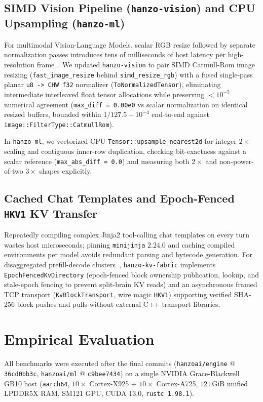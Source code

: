 \documentclass[11pt,a4paper]{article}
\begin{document}
\subsection{SIMD Vision Pipeline (\texttt{hanzo-vision}) and CPU Upsampling (\texttt{hanzo-ml})}
For multimodal Vision-Language Models, scalar RGB resize followed by separate normalization passes introduces tens of milliseconds of host latency per high-resolution frame~\cite{hanzo2026engine}. We updated \texttt{hanzo-vision} to pair SIMD Catmull-Rom image resizing (\texttt{fast\_image\_resize} behind \texttt{simd\_resize\_rgb}) with a fused single-pass planar \texttt{u8 -> CHW f32} normalizer (\texttt{ToNormalizedTensor}), eliminating intermediate interleaved float tensor allocations while preserving $<10^{-5}$ numerical agreement (\texttt{max\_diff = 0.00e0} vs scalar normalization on identical resized buffers, bounded within $1/127.5 + 10^{-4}$ end-to-end against \texttt{image::FilterType::CatmullRom}).

In \texttt{hanzo-ml}, we vectorized CPU \texttt{Tensor::upsample\_nearest2d} for integer $2\times$ scaling and contiguous inner-row duplication, checking bit-exactness against a scalar reference (\texttt{max\_abs\_diff = 0.0}) and measuring both $2\times$ and non-power-of-two $3\times$ shapes explicitly.

\subsection{Cached Chat Templates and Epoch-Fenced \texttt{HKV1} KV Transfer}
Repeatedly compiling complex Jinja2 tool-calling chat templates on every turn wastes host microseconds; pinning \texttt{minijinja} $2.24.0$ and caching compiled environments per model avoids redundant parsing and bytecode generation. For disaggregated prefill-decode clusters~\cite{kwon2023pagedattention,dao2022flashattention}, \texttt{hanzo-kv-fabric} implements \texttt{EpochFencedKvDirectory} (epoch-fenced block ownership publication, lookup, and stale-epoch fencing to prevent split-brain KV reads) and an asynchronous framed TCP transport (\texttt{KvBlockTransport}, wire magic \texttt{HKV1}) supporting verified SHA-256 block pushes and pulls without external C++ transport libraries.

\section{Empirical Evaluation}
\label{sec:eval}

All benchmarks were executed after the final commits (\texttt{hanzoai/engine} @ \texttt{36cd0bb3c}, \texttt{hanzoai/ml} @ \texttt{c9bee7434}) on a single NVIDIA Grace-Blackwell GB10 host (\texttt{aarch64}, $10\times$ Cortex-X925 + $10\times$ Cortex-A725, $121\,\text{GiB}$ unified LPDDR5X RAM, SM121 GPU, CUDA 13.0, \texttt{rustc 1.98.1}).
\end{document}
